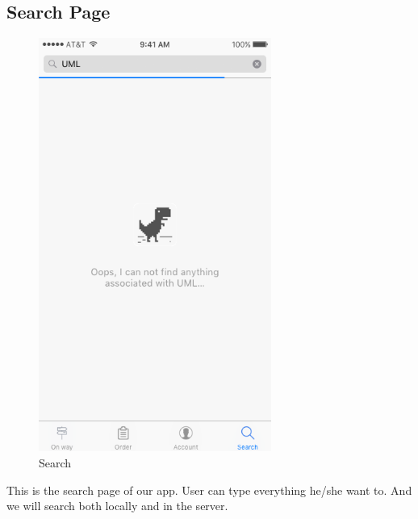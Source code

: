 \documentclass[12pt]{scrreprt}
\begin{document}
\subsection{Search Page}
\begin{figure}[htbp]
  \centering\includegraphics[width=3in]{DocumentRes/Search.png}
  \caption{Search}
\end{figure}
This is the search page of our app. User can type everything he/she want to. And we will search both locally and in the server.
\end{document}
